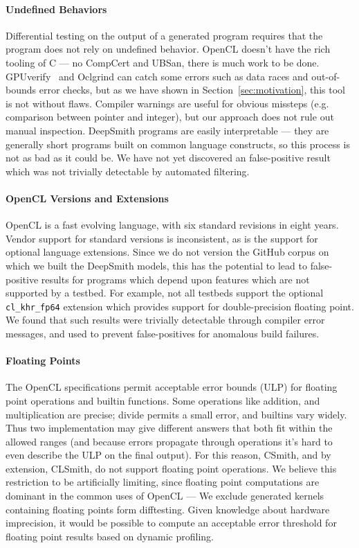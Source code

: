 \paragraph{Undefined Behaviors} %
Differential testing on the output of a generated program requires that the program does not rely on undefined behavior. OpenCL doesn't have the rich tooling of C --- no CompCert and UBSan, there is much work to be done. GPUverify~\cite{Betts2012} and Oclgrind can catch some errors such as data races and out-of-bounds error checks, but as we have shown in Section~\ref{sec:motivation}, this tool is not without flaws. Compiler warnings are useful for obvious missteps (e.g. comparison between pointer and integer), but our approach does not rule out manual inspection. DeepSmith programs are easily interpretable --- they are generally short programs built on common language constructs, so this process is not as bad as it could be. We have not yet discovered an false-positive result which was not trivially detectable by automated filtering.

\paragraph{OpenCL Versions and Extensions} OpenCL is a fast evolving language, with six standard revisions in eight years. Vendor support for standard versions is inconsistent, as is the support for optional language extensions. Since we do not version the GitHub corpus on which we built the DeepSmith models, this has the potential to lead to false-positive results for programs which depend upon features which are not supported by a testbed. For example, not all testbeds support the optional \texttt{cl\_khr\_fp64} extension which provides support for double-precision floating point. We found that such results were trivially detectable through compiler error messages, and used to prevent false-positives for anomalous build failures.

\paragraph{Floating Points} The OpenCL specifications permit acceptable error bounds (ULP) for floating point operations and builtin functions. Some operations like addition, and multiplication are precise; divide permits a small error, and builtins vary widely. Thus two implementation may give different answers that both fit within the allowed ranges (and because errors propagate through operations it's hard to even describe the ULP on the final output). For this reason, CSmith, and by extension, CLSmith, do not support floating point operations. We believe this restriction to be artificially limiting, since floating point computations are dominant in the common uses of OpenCL --- %
We exclude generated kernels containing floating points form difftesting. Given knowledge about hardware imprecision, it would be possible to compute an acceptable error threshold for floating point results based on dynamic profiling.


